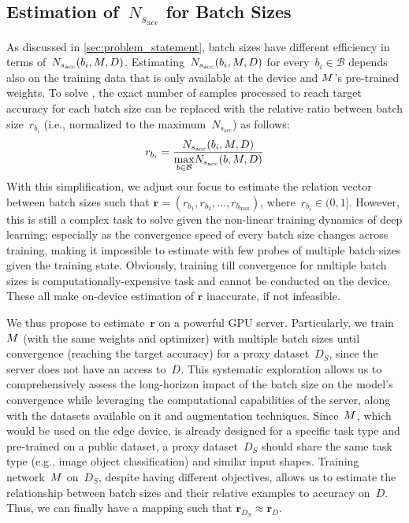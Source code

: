 \subsection{Estimation of~$N_{s_{\text{acc}}}$ for Batch Sizes} \label{subsec:proxy}


As discussed in \cref{sec:problem_statement}, batch sizes have different efficiency in terms of~$ N_{{s}_{\text{acc}}}(b_{i}, M, D)$. 
Estimating~$ N_{{s}_\text{{acc}}}(b_{i}, M, D)$ for every~$b_{i}\in\mathcal{B}$ depends also on the training data that is only available at the device and $M$'s pre-trained weights. To solve , the exact number of samples processed to reach target accuracy for each batch size can be replaced with the relative ratio between batch size~$r_{b_{i}}$ (i.e., normalized to the maximum~$N_{s_{\text{acc}}}$) as follows:
\begin{equation}
    r_{b_{i}}= \frac{N_{{s}_{\text{acc}}}(b_{i}, M, D)} {\underset{b \in \mathcal{B}}{\max} N_{{s}_{\text{acc}}}(b, M, D)}
\end{equation}
With this simplification, we adjust our focus to estimate the relation vector between batch sizes such that $\mathbf{r} = (r_{b_{1}},r_{b_{2}}, \ldots ,r_{b_\text{{max}}})$, where~$r_{b_{i}} \in (0, 1]$. However, this is still a complex task to solve given the non-linear training dynamics of deep learning; especially as the convergence speed of every batch size changes across training, making it impossible to estimate with few probes of multiple batch sizes given the training state. Obviously, training till convergence for multiple batch sizes is computationally-expensive task and cannot be conducted on the device. These all make on-device estimation of $\mathbf{r}$ inaccurate, if not infeasible.




We thus propose to estimate~$\mathbf{r}$ on a powerful GPU server. Particularly, we train~$M$ (with the same weights and optimizer) with multiple batch sizes until convergence (reaching the target accuracy) for a proxy dataset~$D_S$, since the server does not have an access to~$D$. This systematic exploration allows us to comprehensively assess the long-horizon impact of the batch size on the model's convergence while leveraging the computational capabilities of the server,  along with the datasets available on it and augmentation techniques.  Since~$M$, which would be used on the edge device, is already designed for a specific task type and pre-trained on a public dataset, a proxy dataset~$D_{S}$ should share the same task type (e.g., image object classification) and similar input shapes. Training network~$M$ on~$D_{S}$, despite having different objectives, allows us to estimate the relationship between batch sizes and their relative examples to accuracy on~$D$. 
Thus, we can finally have a mapping such that $\mathbf{r}_{D_{S}} \approx \mathbf{r}_{D}$.  

